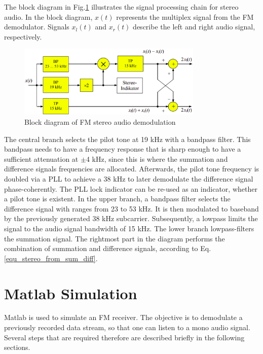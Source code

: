 \documentclass[conference]{IEEEtran}
\begin{document}
    The block diagram in Fig.\ref{fig_bd_stereo_demod} illustrates the signal processing chain for stereo audio. In the block diagram, $x(t)$ represents the multiplex signal from the FM demodulator. Signals $x_l(t)$ and $x_r(t)$ describe the left and right audio signal, respectively.

    \begin{figure}[!h]
      \centering
        \includegraphics[width=8.8cm]{img/fm-demod-stereo-audio.png}
      \caption{Block diagram of FM stereo audio demodulation \cite{ref_roppel}}
      \label{fig_bd_stereo_demod}
    \end{figure}

    The central branch selects the pilot tone at 19 kHz with a bandpass filter.
    This bandpass needs to have a frequency response that is sharp enough to have a sufficient attenuation at $\pm$4 kHz, since this is where the summation and difference signals frequencies are allocated.
    Afterwards, the pilot tone frequency is doubled via a PLL to achieve a 38 kHz to later demodulate the difference signal phase-coherently.
    The PLL lock indicator can be re-used as an indicator, whether a pilot tone is existent.
    In the upper branch, a bandpass filter selects the difference signal with ranges from 23 to 53 kHz.
    It is then modulated to baseband by the previously generated 38 kHz subcarrier.
    Subsequently, a lowpass limits the signal to the audio signal bandwidth of 15 kHz.
    The lower branch lowpass-filters the summation signal.
    The rightmost part in the diagram performs the combination of summation and difference signals, according to Eq.\ref{equ_stereo_from_sum_diff}.

\section{Matlab Simulation}
  Matlab is used to simulate an FM receiver.
  The objective is to demodulate a previously recorded data stream, so that one can listen to a mono audio signal.
  Several steps that are required therefore are described briefly in the following sections.
\end{document}
